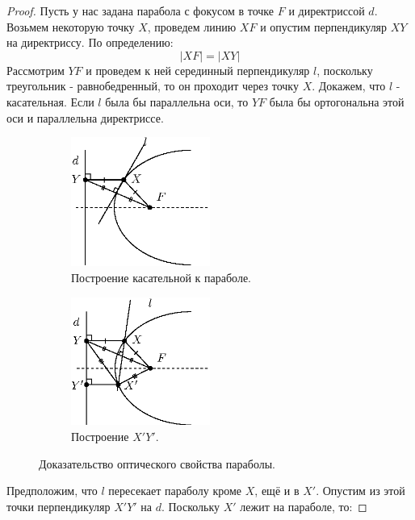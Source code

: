 \documentclass[12pt]{article}
\theoremstyle{definition}
\begin{document}
\begin{proof}
	Пусть у нас задана парабола с фокусом в точке $F$ и директриссой $d$. Возьмем некоторую точку $X$, проведем линию $XF$ и опустим перпендикуляр $XY$ на директриссу. По определению:
	$$
		|XF| = |XY|
	$$
	Рассмотрим $YF$ и проведем к ней серединный перпендикуляр $l$, поскольку треугольник - равнобедренный, то он проходит через точку $X$. Докажем, что $l$ - касательная. Если $l$ была бы параллельна оси, то $YF$ была бы ортогональна этой оси и параллельна директриссе.

	\begin{figure}[H]
		\begin{subfigure}[t]{.5\textwidth}
			\centering
			\includegraphics[width=0.5\textwidth]{ANGL2_13.eps}
			\caption{Построение касательной к параболе.}
			\label{2_13}
		\end{subfigure}
		\begin{subfigure}[t]{.5\textwidth}
			\centering
			\includegraphics[width=0.5\textwidth]{ANGL2_14.eps}
			\caption{Построение $X'Y'$.}
			\label{2_14}
		\end{subfigure}
		\caption{Доказательство оптического свойства параболы.}
	\end{figure}
	Предположим, что $l$ пересекает параболу кроме $X$, ещё и в $X'$. Опустим из этой точки перпендикуляр $X'Y'$ на $d$. Поскольку $X'$ лежит на параболе, то:

\end{proof}
\end{document}
